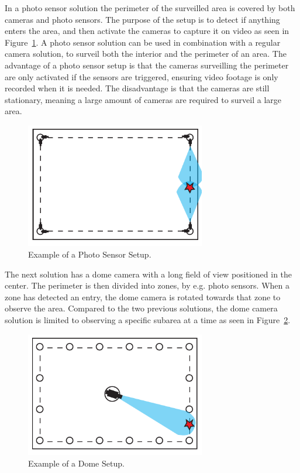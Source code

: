 In a photo sensor solution the perimeter of the surveilled area is covered by both cameras and photo sensors.
The purpose of the setup is to detect if anything enters the area, and then activate the cameras to capture it on video as seen in Figure~\ref{fig:photo_sensor}.
A photo sensor solution can be used in combination with a regular camera solution, to surveil both the interior and the perimeter of an area.
The advantage of a photo sensor setup is that the cameras surveilling the perimeter are only activated if the sensors are triggered, ensuring video footage is only recorded when it is needed.
The disadvantage is that the cameras are still stationary, meaning a large amount of cameras are required to surveil a large area. \\

\begin{figure}[htb]
    \centering
    \includegraphics[width=0.7\textwidth]{gfx/light_sensor.pdf}
    \caption{Example of a Photo Sensor Setup.}
    \label{fig:photo_sensor}
\end{figure}

The next solution has a dome camera with a long field of view positioned in the center.
The perimeter is then divided into zones, by e.g. photo sensors.
When a zone has detected an entry, the dome camera is rotated towards that zone to observe the area.
Compared to the two previous solutions, the dome camera solution is limited to observing a specific subarea at a time as seen in Figure~\ref{fig:drone_sensor}. \\

\begin{figure}[htb]
    \centering
    \includegraphics[width=0.7\textwidth]{gfx/drome_sensor.pdf}
    \caption{Example of a Dome Setup.}
    \label{fig:drone_sensor}
\end{figure}
